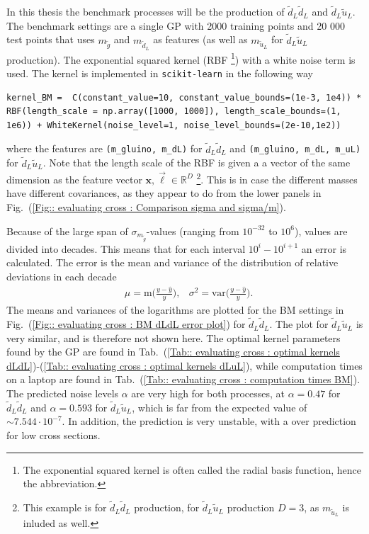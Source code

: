 \documentclass[twoside,english]{uiofysmaster}
\begin{document}
In this thesis the benchmark processes will be the production of $\tilde{d}_L \tilde{d}_L$ and $\tilde{d}_L \tilde{u}_L$. The benchmark settings are a single GP with 2000 training points and 20 000 test points that uses $m_{\tilde{g}}$ and $m_{\tilde{d}_L}$ as features (as well as $m_{\tilde{u}_L}$ for $\tilde{d}_L \tilde{u}_L$ production). The exponential squared kernel (RBF \footnote{The exponential squared kernel is often called the radial basis function, hence the abbreviation.}) with a white noise term is used. The kernel is implemented in \verb|scikit-learn| in the following way 
\begin{lstlisting}
kernel_BM =  C(constant_value=10, constant_value_bounds=(1e-3, 1e4)) * RBF(length_scale = np.array([1000, 1000]), length_scale_bounds=(1, 1e6)) + WhiteKernel(noise_level=1, noise_level_bounds=(2e-10,1e2))
\end{lstlisting} 
where the features are \verb|(m_gluino, m_dL)| for $\tilde{d}_L \tilde{d}_L$ and \verb|(m_gluino, m_dL, m_uL)| for $\tilde{d}_L \tilde{u}_L$. Note that the length scale of the RBF is given a a vector of the same dimension as the feature vector $\textbf{x},\vec{\ell} \in \mathbb{R}^D$ \footnote{This example is for $\tilde{d}_L \tilde{d}_L$ production, for $\tilde{d}_L \tilde{u}_L$ production $D=3$, as $m_{\tilde{u}_L}$ is inluded as well.}. This is in case the different masses have different covariances, as they appear to do from the lower panels in Fig.\ (\ref{Fig:: evaluating cross : Comparison sigma and sigma/m}). 

Because of the large span of $\sigma_{m_{\tilde{g}}}$-values (ranging from $10^{-32}$ to $10^6$), values are divided into decades. This means that for each interval $10^i-10^{i+1}$ an error is calculated. The error is the mean and variance of the distribution of relative deviations in each decade
\begin{align}
& \mu = \text{m} \Bigg(\frac{y - \hat{y}}{y} \Bigg),
& \sigma^2 = \text{var} \Bigg(\frac{y - \hat{y}}{y} \Bigg).
\end{align}
The means and variances of the logarithms are plotted for the BM settings in Fig.\ (\ref{Fig:: evaluating cross : BM dLdL error plot}) for $\tilde{d}_L \tilde{d}_L$. The plot for $\tilde{d}_L \tilde{u}_L$ is very similar, and is therefore not shown here. The optimal kernel parameters  found by the GP are found in Tab.\ (\ref{Tab:: evaluating cross : optimal kernels dLdL})-(\ref{Tab:: evaluating cross : optimal kernels dLuL}), while computation times on a laptop are found in Tab.\ (\ref{Tab:: evaluating cross : computation times BM}). The predicted noise levels $\alpha$ are very high for both processes, at $\alpha=0.47$ for $\tilde{d}_L \tilde{d}_L$ and $\alpha=0.593$ for $\tilde{d}_L \tilde{u}_L$, which is far from the expected value of $\sim 7.544 \cdot 10^{-7}$. In addition, the prediction is very unstable, with a over prediction for low cross sections.
\end{document}
